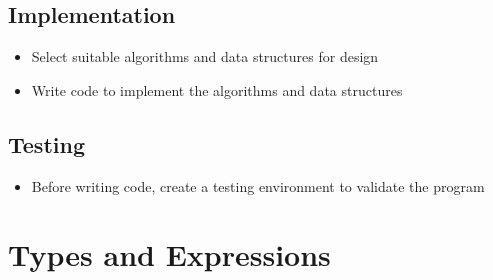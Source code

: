 \documentclass{article}
\begin{document}
\subsection{Implementation}
\begin{itemize}
    \item Select suitable algorithms and data structures for design
    \item Write code to implement the algorithms and data structures
\end{itemize}
\subsection{Testing}
\begin{itemize}
    \item Before writing code, create a testing environment to validate the program
\end{itemize}
\section{Types and Expressions}
\end{document}
